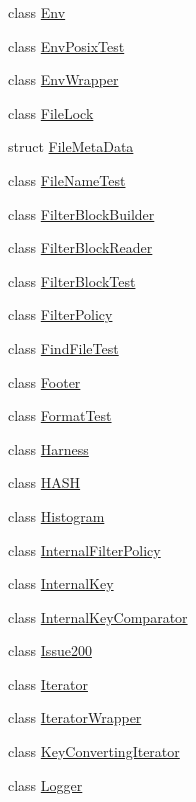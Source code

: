 \begin{DoxyCompactItemize}
class \hyperlink{classleveldb_1_1_env}{Env}
\item 
class \hyperlink{classleveldb_1_1_env_posix_test}{Env\+Posix\+Test}
\item 
class \hyperlink{classleveldb_1_1_env_wrapper}{Env\+Wrapper}
\item 
class \hyperlink{classleveldb_1_1_file_lock}{File\+Lock}
\item 
struct \hyperlink{structleveldb_1_1_file_meta_data}{File\+Meta\+Data}
\item 
class \hyperlink{classleveldb_1_1_file_name_test}{File\+Name\+Test}
\item 
class \hyperlink{classleveldb_1_1_filter_block_builder}{Filter\+Block\+Builder}
\item 
class \hyperlink{classleveldb_1_1_filter_block_reader}{Filter\+Block\+Reader}
\item 
class \hyperlink{classleveldb_1_1_filter_block_test}{Filter\+Block\+Test}
\item 
class \hyperlink{classleveldb_1_1_filter_policy}{Filter\+Policy}
\item 
class \hyperlink{classleveldb_1_1_find_file_test}{Find\+File\+Test}
\item 
class \hyperlink{classleveldb_1_1_footer}{Footer}
\item 
class \hyperlink{classleveldb_1_1_format_test}{Format\+Test}
\item 
class \hyperlink{classleveldb_1_1_harness}{Harness}
\item 
class \hyperlink{classleveldb_1_1_h_a_s_h}{H\+A\+S\+H}
\item 
class \hyperlink{classleveldb_1_1_histogram}{Histogram}
\item 
class \hyperlink{classleveldb_1_1_internal_filter_policy}{Internal\+Filter\+Policy}
\item 
class \hyperlink{classleveldb_1_1_internal_key}{Internal\+Key}
\item 
class \hyperlink{classleveldb_1_1_internal_key_comparator}{Internal\+Key\+Comparator}
\item 
class \hyperlink{classleveldb_1_1_issue200}{Issue200}
\item 
class \hyperlink{classleveldb_1_1_iterator}{Iterator}
\item 
class \hyperlink{classleveldb_1_1_iterator_wrapper}{Iterator\+Wrapper}
\item 
class \hyperlink{classleveldb_1_1_key_converting_iterator}{Key\+Converting\+Iterator}
\item 
class \hyperlink{classleveldb_1_1_logger}{Logger}

\end{DoxyCompactItemize}
